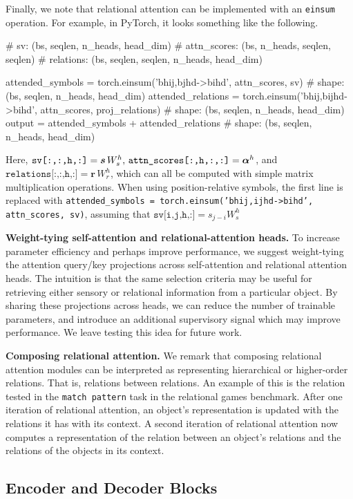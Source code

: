 Finally, we note that relational attention can be implemented with an \texttt{einsum} operation. For example, in PyTorch, it looks something like the following.
\begin{python}
# sv: (bs, seqlen, n_heads, head_dim)
# attn_scores: (bs, n_heads, seqlen, seqlen)
# relations: (bs, seqlen, seqlen, n_heads, head_dim)

attended_symbols = torch.einsum('bhij,bjhd->bihd', attn_scores, sv)
# shape: (bs, seqlen, n_heads, head_dim)
attended_relations = torch.einsum('bhij,bijhd->bihd', attn_scores, proj_relations)
# shape: (bs, seqlen, n_heads, head_dim)
output = attended_symbols + attended_relations
# shape: (bs, seqlen, n_heads, head_dim)
\end{python}

Here, $\texttt{sv[:,:,h,:]} = \bm{s} \,W_s^h,\, \texttt{attn\_scores[:,h,:,:]} = \bm{\alpha}^h$, and $\texttt{relations[:,:,h,:]} = \bm{r} \, W_r^h$, which can all be computed with simple matrix multiplication operations. When using position-relative symbols, the first line is replaced with \texttt{attended\_symbols = torch.einsum('bhij,ijhd->bihd', attn\_scores, sv)}, assuming that $\texttt{sv[i,j,h,:]} = s_{j-i} W_s^h$

\textbf{Weight-tying self-attention and relational-attention heads.} To increase parameter efficiency and perhaps improve performance, we suggest weight-tying the attention query/key projections across self-attention and relational attention heads. The intuition is that the same selection criteria may be useful for retrieving either sensory or relational information from a particular object. By sharing these projections across heads, we can reduce the number of trainable parameters, and introduce an additional supervisory signal which may improve performance. We leave testing this idea for future work.

\textbf{Composing relational attention.} We remark that composing relational attention modules can be interpreted as representing hierarchical or higher-order relations. That is, relations between relations. An example of this is the relation tested in the \texttt{match pattern} task in the relational games benchmark. After one iteration of relational attention, an object's representation is updated with the relations it has with its context. A second iteration of relational attention now computes a representation of the relation between an object's relations and the relations of the objects in its context.

\subsection{Encoder and Decoder Blocks}

